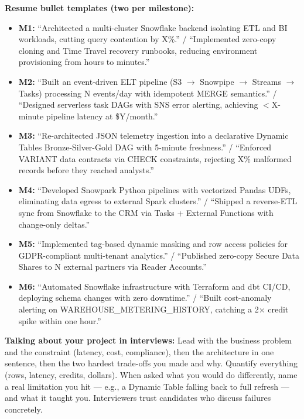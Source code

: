 \documentclass[11pt, a4paper]{article}
\begin{document}
\noindent\textbf{Resume bullet templates (two per milestone):}
\begin{itemize}[label=-, nosep]
    \item \textbf{M1:} ``Architected a multi-cluster Snowflake backend isolating ETL and BI workloads, cutting query contention by X\%.'' / ``Implemented zero-copy cloning and Time Travel recovery runbooks, reducing environment provisioning from hours to minutes.''
    \item \textbf{M2:} ``Built an event-driven ELT pipeline (S3 $\rightarrow$ Snowpipe $\rightarrow$ Streams $\rightarrow$ Tasks) processing N events/day with idempotent MERGE semantics.'' / ``Designed serverless task DAGs with SNS error alerting, achieving $<$X-minute pipeline latency at \$Y/month.''
    \item \textbf{M3:} ``Re-architected JSON telemetry ingestion into a declarative Dynamic Tables Bronze-Silver-Gold DAG with 5-minute freshness.'' / ``Enforced VARIANT data contracts via CHECK constraints, rejecting X\% malformed records before they reached analysts.''
    \item \textbf{M4:} ``Developed Snowpark Python pipelines with vectorized Pandas UDFs, eliminating data egress to external Spark clusters.'' / ``Shipped a reverse-ETL sync from Snowflake to the CRM via Tasks + External Functions with change-only deltas.''
    \item \textbf{M5:} ``Implemented tag-based dynamic masking and row access policies for GDPR-compliant multi-tenant analytics.'' / ``Published zero-copy Secure Data Shares to N external partners via Reader Accounts.''
    \item \textbf{M6:} ``Automated Snowflake infrastructure with Terraform and dbt CI/CD, deploying schema changes with zero downtime.'' / ``Built cost-anomaly alerting on WAREHOUSE\_METERING\_HISTORY, catching a 2$\times$ credit spike within one hour.''
\end{itemize}

\noindent\textbf{Talking about your project in interviews:} Lead with the business problem and the constraint (latency, cost, compliance), then the architecture in one sentence, then the two hardest trade-offs you made and why. Quantify everything (rows, latency, credits, dollars). When asked what you would do differently, name a real limitation you hit --- e.g., a Dynamic Table falling back to full refresh --- and what it taught you. Interviewers trust candidates who discuss failures concretely.

\newpage
\end{document}
